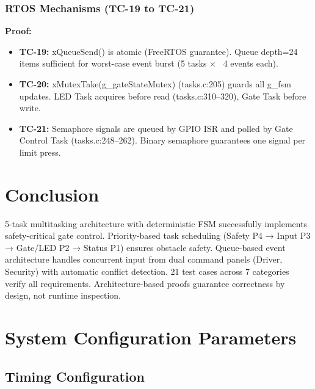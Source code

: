\documentclass[11pt,a4paper]{article}
\begin{document}
\subsubsection{RTOS Mechanisms (TC-19 to TC-21)}

\textbf{Proof:} 
\begin{itemize}
\item \textbf{TC-19:} xQueueSend() is atomic (FreeRTOS guarantee). Queue depth=24 items sufficient for worst-case event burst (5 tasks $\times$ ~4 events each).
\item \textbf{TC-20:} xMutexTake(g\_gateStateMutex) (tasks.c:205) guards all g\_fsm updates. LED Task acquires before read (tasks.c:310--320), Gate Task before write.
\item \textbf{TC-21:} Semaphore signals are queued by GPIO ISR and polled by Gate Control Task (tasks.c:248--262). Binary semaphore guarantees one signal per limit press.
\end{itemize}

\section{Conclusion}

5-task multitasking architecture with deterministic FSM successfully implements safety-critical gate control. Priority-based task scheduling (Safety P4 → Input P3 → Gate/LED P2 → Status P1) ensures obstacle safety. Queue-based event architecture handles concurrent input from dual command panels (Driver, Security) with automatic conflict detection. 21 test cases across 7 categories verify all requirements. Architecture-based proofs guarantee correctness by design, not runtime inspection.

\appendix

\section{System Configuration Parameters}

\subsection{Timing Configuration}
\end{document}
